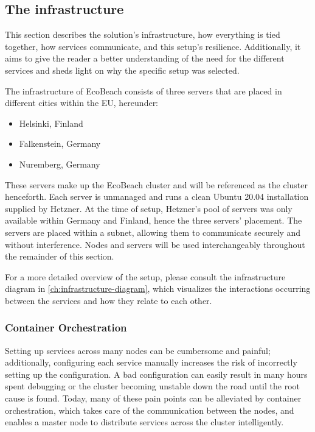 \subsection{The infrastructure}\label{subsec:the-infrastructure}

This section describes the solution's infrastructure, how everything is tied together, how services communicate, and this setup's resilience. Additionally, it aims to give the reader a better understanding of the need for the different services and sheds light on why the specific setup was selected. 

The infrastructure of EcoBeach consists of three servers that are placed in different cities within the EU, hereunder: 

\begin{itemize}
    \item Helsinki, Finland
    \item Falkenstein, Germany
    \item Nuremberg, Germany
\end{itemize}


These servers make up the EcoBeach cluster and will be referenced as the cluster henceforth. Each server is unmanaged and runs a clean Ubuntu 20.04 installation supplied by Hetzner. At the time of setup, Hetzner's pool of servers was only available within Germany and Finland, hence the three servers' placement. The servers are placed within a subnet, allowing them to communicate securely and without interference. 
Nodes and servers will be used interchangeably throughout the remainder of this section. 

For a more detailed overview of the setup, please consult the infrastructure diagram in \autoref{ch:infrastructure-diagram}, which visualizes the interactions occurring between the services and how they relate to each other.

\subsubsection{Container Orchestration}

Setting up services across many nodes can be cumbersome and painful; additionally, configuring each service manually increases the risk of incorrectly setting up the configuration. A bad configuration can easily result in many hours spent debugging or the cluster becoming unstable down the road until the root cause is found. 
Today, many of these pain points can be alleviated by container orchestration, which takes care of the communication between the nodes, and enables a master node to distribute services across the cluster intelligently. 


